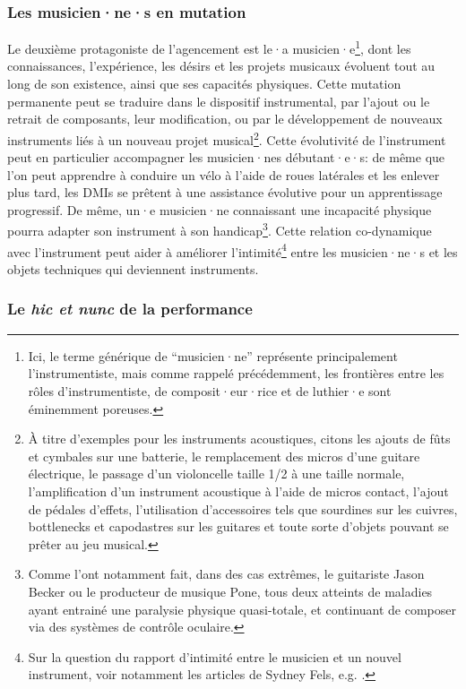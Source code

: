 \subsubsection{Les musicien·ne·s en mutation}

\noindent Le deuxième protagoniste de l'agencement est le·a musicien·e\footnote{Ici, le terme générique de ``musicien·ne'' représente principalement l'instrumentiste, mais comme rappelé précédemment, les frontières entre les rôles d'instrumentiste, de composit·eur·rice et de luthier·e sont éminemment poreuses.}, dont les connaissances, l'expérience, les désirs et les projets musicaux évoluent tout au long de son existence, ainsi que ses capacités physiques. Cette mutation permanente peut se traduire dans le dispositif instrumental, par l'ajout ou le retrait de composants, leur modification, ou par le développement de nouveaux instruments liés à un nouveau projet musical\footnote{À titre d'exemples pour les instruments acoustiques, citons les ajouts de fûts et cymbales sur une batterie, le remplacement des micros d'une guitare électrique, le passage d'un violoncelle taille 1/2 à une taille normale, l'amplification d'un instrument acoustique à l'aide de micros contact, l'ajout de pédales d'effets, l'utilisation d'accessoires tels que sourdines sur les cuivres, bottlenecks et capodastres sur les guitares et toute sorte d'objets pouvant se prêter au jeu musical.}. Cette évolutivité de l'instrument peut en particulier accompagner les musicien·nes débutant·e·s: de même que l'on peut apprendre à conduire un vélo à l'aide de roues latérales et les enlever plus tard, les \glspl{DMI} se prêtent à une assistance évolutive pour un apprentissage progressif. De même, un·e musicien·ne connaissant une incapacité physique pourra adapter son instrument à son handicap\footnote{Comme l'ont notamment fait, dans des cas extrêmes, le guitariste Jason Becker ou le producteur de musique Pone, tous deux atteints de maladies ayant entrainé une paralysie physique quasi-totale, et continuant de composer via des systèmes de contrôle oculaire.}. Cette relation co-dynamique avec l'instrument peut aider à améliorer l'intimité\footnote{Sur la question du rapport d'intimité entre le musicien et un nouvel instrument, voir notamment les articles de Sydney Fels, e.g. \cite{fels_designing_2004}.} entre les musicien·ne·s et les objets techniques qui deviennent instruments.

\subsubsection{Le \textit{hic et nunc} de la performance}

